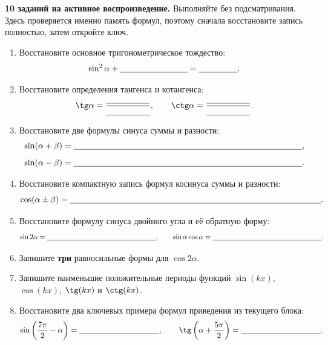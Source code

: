 \documentclass[a4paper,12pt]{article}
\begin{document}
\textbf{10 заданий на активное воспроизведение.} Выполняйте без подсматривания. Здесь проверяется именно память формул, поэтому сначала восстановите запись полностью, затем откройте ключ.

\begin{enumerate}
  \item Восстановите основное тригонометрическое тождество:
  \[
  \sin^2\alpha+\underline{\hspace{28mm}}=\underline{\hspace{16mm}}.
  \]

  \item Восстановите определения тангенса и котангенса:
  \[
  \tg\alpha=\frac{\underline{\hspace{18mm}}}{\underline{\hspace{18mm}}},
  \qquad
  \ctg\alpha=\frac{\underline{\hspace{18mm}}}{\underline{\hspace{18mm}}}.
  \]

  \item Восстановите две формулы синуса суммы и разности:
  \[
  \sin(\alpha+\beta)=\underline{\hspace{95mm}},
  \]
  \[
  \sin(\alpha-\beta)=\underline{\hspace{95mm}}.
  \]

  \item Восстановите компактную запись формул косинуса суммы и разности:
  \[
  \cos(\alpha\pm\beta)=\underline{\hspace{105mm}}.
  \]

  \item Восстановите формулу синуса двойного угла и её обратную форму:
  \[
  \sin2\alpha=\underline{\hspace{55mm}},
  \qquad
  \sin\alpha\cos\alpha=\underline{\hspace{55mm}}.
  \]

  \item Запишите \textbf{три} равносильные формы для $\cos2\alpha$.
  \vspace{18mm}

  \item Запишите наименьшие положительные периоды функций $\sin(kx)$, $\cos(kx)$, $\tg(kx)$ и $\ctg(kx)$.
  \vspace{18mm}

  \item Восстановите два ключевых примера формул приведения из текущего блока:
  \[
  \sin\left(\frac{7\pi}{2}-\alpha\right)=\underline{\hspace{35mm}},
  \qquad
  \tg\left(\alpha+\frac{5\pi}{2}\right)=\underline{\hspace{35mm}}.
  \]


\end{enumerate}
\end{document}

